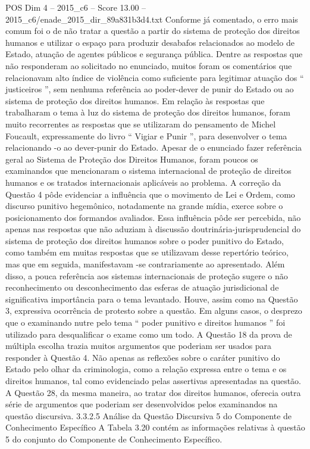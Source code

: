 \begin{textsample}{POS Dim 4 – 2015\_c6 – Score 13.00 – 2015\_c6/enade\_2015\_dir\_89a831b3d4.txt}
Conforme já comentado, o erro mais comum foi o de não tratar a questão a partir do sistema de proteção dos direitos humanos e utilizar o espaço para produzir desabafos relacionados ao modelo de Estado, atuação de agentes públicos e segurança pública.
Dentre as respostas que não responderam ao solicitado no enunciado, muitos foram os comentários que relacionavam alto índice de violência como suficiente para legitimar atuação dos “ justiceiros ”, sem nenhuma referência ao poder-dever de punir do Estado ou ao sistema de proteção dos direitos humanos.
Em relação às respostas que trabalharam o tema à luz do sistema de proteção dos direitos humanos, foram muito recorrentes as respostas que se utilizaram do pensamento de Michel Foucault, expressamente do livro “ Vigiar e Punir ”, para desenvolver o tema relacionando -o ao dever-punir do Estado.
Apesar de o enunciado fazer referência geral ao Sistema de Proteção dos Direitos Humanos, foram poucos os examinandos que mencionaram o sistema internacional de proteção de direitos humanos e os tratados internacionais aplicáveis ao problema.
A correção da Questão 4 pôde evidenciar a influência que o movimento de Lei e Ordem, como discurso punitivo hegemônico, notadamente na grande mídia, exerce sobre o posicionamento dos formandos avaliados.
Essa influência pôde ser percebida, não apenas nas respostas que não aduziam à discussão doutrinária-jurisprudencial do sistema de proteção dos direitos humanos sobre o poder punitivo do Estado, como também em muitas respostas que se utilizavam desse repertório teórico, mas que em seguida, manifestavam -se contrariamente ao apresentado.
Além disso, a pouca referência aos sistemas internacionais de proteção sugere o não reconhecimento ou desconhecimento das esferas de atuação jurisdicional de significativa importância para o tema levantado.
Houve, assim como na Questão 3, expressiva ocorrência de protesto sobre a questão.
Em alguns casos, o desprezo que o examinando nutre pelo tema “ poder punitivo e direitos humanos ” foi utilizado para desqualificar o exame como um todo.
A Questão 18 da prova de múltipla escolha trazia muitos argumentos que poderiam ser usados para responder à Questão 4.
Não apenas as reflexões sobre o caráter punitivo do Estado pelo olhar da criminologia, como a relação expressa entre o tema e os direitos humanos, tal como evidenciado pelas assertivas apresentadas na questão.
A Questão 28, da mesma maneira, ao tratar dos direitos humanos, oferecia outra série de argumentos que poderiam ser desenvolvidos pelos examinandos na questão discursiva. 3.3.2.5 Análise da Questão Discursiva 5 do Componente de Conhecimento Específico A Tabela 3.20 contém as informações relativas à questão 5 do conjunto do Componente de Conhecimento Específico.

\end{textsample}
